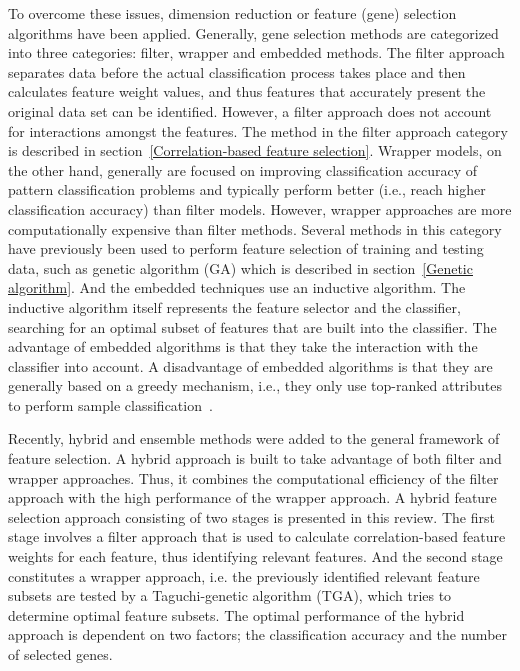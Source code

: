 \documentclass[runningheads]{llncs}
\begin{document}
To overcome these issues, dimension reduction or feature (gene) selection algorithms have been applied. Generally, gene selection methods are categorized into three categories: filter, wrapper and embedded methods. The filter approach separates data before the actual classification process takes place and then calculates feature weight values, and thus features that accurately present the original data set can be identified. However, a filter approach does not account for interactions amongst the features. The method in the filter approach category is described in section~\ref{Correlation-based feature selection}. Wrapper models, on the other hand, generally are focused on improving classification accuracy of pattern classification problems and typically perform better (i.e., reach higher classification accuracy) than filter models. However, wrapper approaches are more computationally expensive than filter methods. Several methods in this category have previously been used to perform feature selection of training and testing data, such as genetic algorithm (GA) which is described in section~\ref{Genetic algorithm}. And the embedded techniques use an inductive algorithm. The inductive algorithm itself represents the feature selector and the classifier, searching for an optimal subset of features that are built into the classifier. The advantage of embedded algorithms is that they take the interaction with the classifier into account. A disadvantage of embedded algorithms is that they are generally based on a greedy mechanism, i.e., they only use top-ranked attributes to perform sample classification~\cite{saeys2007review}\cite{yang2010multi}.

Recently, hybrid and ensemble methods were added to the general framework of feature selection. A hybrid approach is built to take advantage of both filter and wrapper approaches. Thus, it combines the computational efficiency of the filter approach with the high performance of the wrapper approach. A hybrid feature selection approach consisting of two stages is presented in this review. The first stage involves a filter approach that is used to calculate correlation-based feature weights for each feature, thus identifying relevant features. And the second stage constitutes a wrapper approach, i.e. the previously identified relevant feature subsets are tested by a Taguchi-genetic algorithm (TGA), which tries to determine optimal feature subsets. The optimal performance of the hybrid approach is dependent on two factors; the classification accuracy and the number of selected genes.
\end{document}
